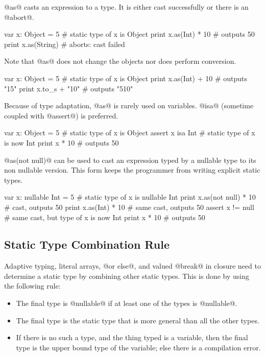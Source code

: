 @as@ casts an expression to a type.
It is either cast successfully or there is an @abort@.

\begin{lst}
var x: Object = 5 # static type of x is Object
print x.as(Int) * 10 # outputs 50
print x.as(String) # aborts: cast failed
\end{lst}

Note that @as@ does not change the objects nor does perform conversion.
\begin{lst}
var x: Object = 5 # static type of x is Object
print x.as(Int) + 10 # outputs "15"
print x.to_s + "10" # outputs "510"
\end{lst}


Because of type adaptation, @as@ is rarely used on variables.
@isa@ (sometime coupled with @assert@) is preferred.
\begin{lst}
var x: Object = 5 # static type of x is Object
assert x isa Int
# static type of x is now Int
print x * 10 # outputs 50
\end{lst}

@as(not null)@ can be used to cast an expression typed by a nullable type to its non nullable version.
This form keeps the programmer from writing explicit static types.

\begin{lst}
var x: nullable Int = 5 # static type of x is nullable Int
print x.as(not null) * 10 # cast, outputs 50
print x.as(Int) * 10 # same cast, outputs 50
assert x != null # same cast, but type of x is now Int
print x * 10 # outputs 50
\end{lst}

\subsection{Static Type Combination Rule}\label{combination}

Adaptive typing, literal arrays, @or else@, and valued @break@ in closure need to determine a static type by combining other static types.
This is done by using the following rule:
\begin{itemize}
\item The final type is @nullable@ if at least one of the types is @nullable@.
\item The final type is the static type that is more general than all the other types.
\item If there is no such a type, and the thing typed is a variable, then the final type is the upper bound type of the variable; else there is a compilation error.
\end{itemize}

